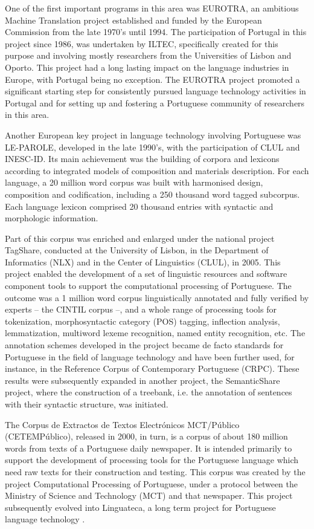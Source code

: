 \begin{multicols}{2}
One of the first important programs in this area was EUROTRA, an ambitious Machine Translation project established and funded by the European Commission from the late 1970's until 1994. The participation of Portugal in this project since 1986, was undertaken by ILTEC, specifically created for this purpose and involving mostly researchers
from the Universities of Lisbon and Oporto. This project had a long lasting impact on the language industries in Europe, with Portugal being no exception. The EUROTRA project promoted a significant starting step for consistently pursued language technology activities in Portugal and for setting up and fostering a Portuguese community of researchers in this area.

Another European key project in language technology involving Portuguese was LE-PAROLE, developed in the late 1990's, with the participation of CLUL and INESC-ID. Its main achievement was the building of corpora and lexicons according to integrated models of composition and materials description. For each language, a 20 million word corpus was built with harmonised design, composition and codification, including a 250 thousand word tagged subcorpus. Each language lexicon comprised 20 thousand entries with syntactic and morphologic information.

Part of this corpus was enriched and enlarged under the national project TagShare, conducted at the University of Lisbon, in the Department of Informatics (NLX) and in the Center of Linguistics (CLUL), in 2005. This project enabled the development of a set of linguistic resources and software component tools to support the computational processing of Portuguese. The outcome was a 1 million word corpus linguistically annotated and fully verified by experts -- the CINTIL corpus \cite{cintil} --, and a whole range of processing tools for tokenization, morphosyntactic category (POS) tagging, inflection analysis, lemmatization, multiword lexeme recognition, named entity recognition, etc. The annotation schemes developed in the project became de facto standards for Portuguese in the field of language technology and have been further used, for instance, in the Reference Corpus of Contemporary Portuguese (CRPC). These results were subsequently expanded in another project,
the SemanticShare project, where the construction of a treebank, i.e. the annotation of sentences with their
syntactic structure, was initiated.

The Corpus de Extractos de Textos Electrónicos MCT/Público (CETEMPúblico), released in 2000, in turn, is a corpus of about 180 million words from texts of a Portuguese daily newspaper. It is intended primarily to support the development of processing tools for the Portuguese language which need raw texts for their construction and testing. This corpus was created by the project Computational Processing of Portuguese, under a protocol between the Ministry of Science and Technology (MCT) and that newspaper. This project subsequently evolved into Linguateca, a long term project for Portuguese language technology \cite{linguateca}.


\end{multicols}
